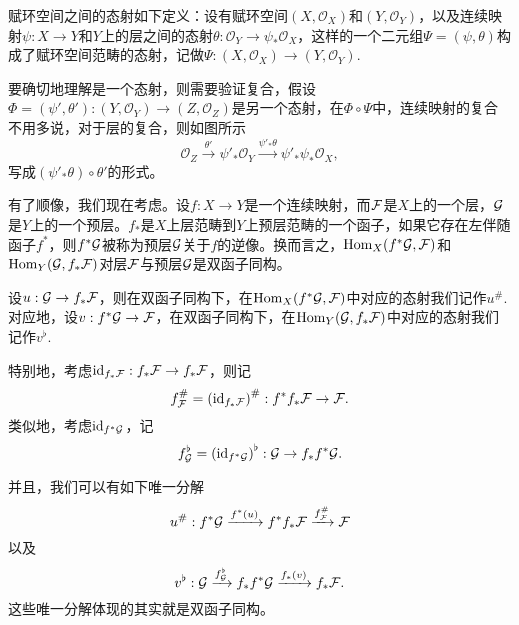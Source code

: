 \begin{para}[赋环空间之间的态射]
赋环空间之间的态射如下定义：设有赋环空间$(X,\mathcal{O}_X)$和$(Y,\mathcal{O}_Y)$，以及连续映射$\psi:X\to Y$和$Y$上的层之间的态射$\theta:\mathcal{O}_Y\to \psi_*\mathcal{O}_X$，这样的一个二元组$\Psi=(\psi,\theta)$构成了赋环空间范畴的态射，记做$\Psi:(X,\mathcal{O}_X)\to (Y,\mathcal{O}_Y)$.
\end{para}

要确切地理解是一个态射，则需要验证复合，假设$\Phi=(\psi',\theta'):(Y,\mathcal{O}_Y)\to (Z,\mathcal{O}_Z)$是另一个态射，在$\Phi\circ \Psi$中，连续映射的复合不用多说，对于层的复合，则如图所示
\[
	\mathcal{O}_Z\xrightarrow{\theta'} \psi'_*\mathcal{O}_Y \xrightarrow{\psi'_*\theta} \psi'_*\psi_*\mathcal{O}_X,
\]
写成$(\psi'_*\theta)\circ \theta'$的形式。

\begin{para}[逆像]
有了顺像，我们现在考虑。设$f:X\to Y$是一个连续映射，而$\mathcal{F}$是$X$上的一个层，$\mathcal{G}$是$Y$上的一个预层。$f_*$是$X$上层范畴到$Y$上预层范畴的一个函子，如果它存在左伴随函子$f^*$，则$f^*\mathcal{G}$被称为预层$\mathcal{G}$关于$f$的逆像。换而言之，$\operatorname{Hom}_X(f^*\mathcal{G},\mathcal{F})$和$\operatorname{Hom}_Y(\mathcal{G},f_*\mathcal{F})$对层$\mathcal{F}$与预层$\mathcal{G}$是双函子同构。
\end{para}


设$u:\mathcal{G}\to f_*\mathcal{F}$，则在双函子同构下，在$\operatorname{Hom}_X(f^*\mathcal{G},\mathcal{F})$中对应的态射我们记作$u^\#$. 对应地，设$v:f^*\mathcal{G}\to \mathcal{F}$，在双函子同构下，在$\operatorname{Hom}_Y(\mathcal{G},f_*\mathcal{F})$中对应的态射我们记作$v^\flat$.

特别地，考虑$\operatorname{id}_{f_*\mathcal{F}}:f_*\mathcal{F}\to f_*\mathcal{F}$，则记
\[
	f^\#_{\mathcal{F}}=\left(\operatorname{id}_{f_*\mathcal{F}}\right)^\#: f^*f_*\mathcal{F} \to \mathcal{F}.
\]
类似地，考虑$\operatorname{id}_{f^*\mathcal{G}}$，记
\[
	f^\flat_{\mathcal{G}} =\left(\operatorname{id}_{f^*\mathcal{G}}\right)^\flat : \mathcal{G} \to f_*f^*\mathcal{G}.
\]

并且，我们可以有如下唯一分解
\[
	u^\#: f^*\mathcal{G} \xrightarrow{f^*(u)} f^*f_*\mathcal{F} \xrightarrow{f^\#_{\mathcal{F}}}\mathcal{F}
\]
以及
\[
	v^\flat : \mathcal{G} \xrightarrow{f^\flat_{\mathcal{G}}} f_*f^*\mathcal{G}\xrightarrow{f_*(v)} f_*\mathcal{F}.
\]
这些唯一分解体现的其实就是双函子同构。

